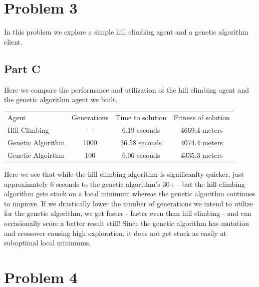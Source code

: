 \documentclass{article}
\begin{document}
\section*{Problem 3}

In this problem we explore a simple hill climbing agent and a genetic algorithm client.

\subsection*{Part C}

Here we compare the performance and utilization of the hill climbing agent and the genetic algorithm agent we built.

\begin{center}
    \begin{tabular}{ l c c c }
         Agent &     Generations &     Time to solution &    Fitness of solution \\ 
        Hill Climbing & --- &   6.19 seconds &        4669.4 meters \\  
        Genetic Algorithm & 1000  & 36.58 seconds  &      4074.4 meters  \\
        Genetic Algoirthm & 100 & 6.06 seconds & 4335.3 meters \\
    \end{tabular}
\end{center}

Here we see that while the hill climbing algorithm is significanlty quicker, just approximately 6 seconds to the genetic algorithm's 30+ - but the hill climbing algorithm gets stuck on a local minimum whereas the genetic algorithm continues to improve. If we drastically lower the number of generations we intend to utilize for the genetic algorithm, we get faster - faster even than hill climbing - and can occasionally score a better result still! Since the genetic algorithm has mutation and crossover causing high exploration, it does not get stuck as easily at suboptimal local minimums.

\section*{Problem 4}
\end{document}
